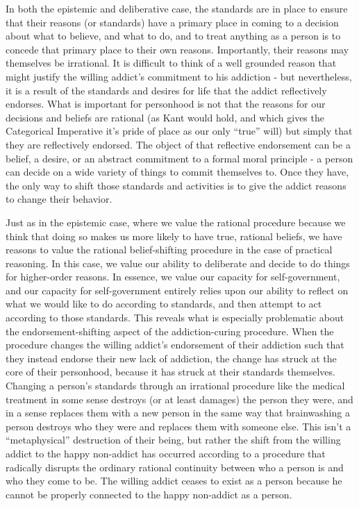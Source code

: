 \documentclass[phd,12pt,oneside,paper=letterpaper]{ubcthesis}
\begin{document}
In both the epistemic and deliberative case, the standards are in place to ensure that their reasons (or standards) have a primary place in coming to a decision about what to believe, and what to do, and to treat anything as a person is to concede that primary place to their own reasons. Importantly, their reasons may themselves be irrational. It is difficult to think of a well grounded reason that might justify the willing addict's commitment to his addiction - but nevertheless, it is a result of the standards and desires for life that the addict reflectively endorses. What is important for personhood is not that the reasons for our decisions and beliefs are rational (as Kant would hold, and which gives the Categorical Imperative it's pride of place as our only ``true'' will) but simply that they are reflectively endorsed. The object of that reflective endorsement can be a belief, a desire, or an abstract commitment to a formal moral principle - a person can decide on a wide variety of things to commit themselves to. Once they have, the only way to shift those standards and activities is to give the addict reasons to change their behavior.

Just as in the epistemic case, where we value the rational procedure because we think that doing so makes us more likely to have true, rational beliefs, we have reasons to value the rational belief-shifting procedure in the case of practical reasoning. In this case, we value our ability to deliberate and decide to do things for higher-order reasons. In essence, we value our capacity for self-government, and our capacity for self-government entirely relies upon our ability to reflect on what we would like to do according to standards, and then attempt to act according to those standards. This reveals what is especially problematic about the endorsement-shifting aspect of the addiction-curing procedure. When the procedure changes the willing addict's endorsement of their addiction such that they instead endorse their new lack of addiction, the change has struck at the core of their personhood, because it has struck at their standards themselves. Changing a person's standards through an irrational procedure like the medical treatment in some sense destroys (or at least damages) the person they were, and in a sense replaces them with a new person in the same way that brainwashing a person destroys who they were and replaces them with someone else. This isn't a ``metaphysical'' destruction of their being, but rather the shift from the willing addict to the happy non-addict has occurred according to a procedure that radically disrupts the ordinary rational continuity between who a person is and who they come to be. The willing addict ceases to exist as a person because he cannot be properly connected to the happy non-addict as a person. 
\end{document}
